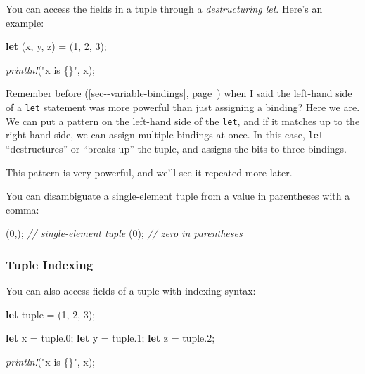\documentclass[a4paper,]{book}
\renewcommand*{\hyperref}[2][\ar]{%
  \def\ar{#2}%
  #2 (\autoref{#1}, page~\pageref{#1})}
\newenvironment{Shaded}{\begin{snugshade}}{\end{snugshade}}
\newcommand{\KeywordTok}[1]{\textcolor[rgb]{0.13,0.29,0.53}{\textbf{{#1}}}}
\newcommand{\DecValTok}[1]{\textcolor[rgb]{0.00,0.00,0.81}{{#1}}}
\newcommand{\StringTok}[1]{\textcolor[rgb]{0.31,0.60,0.02}{{#1}}}
\newcommand{\CommentTok}[1]{\textcolor[rgb]{0.56,0.35,0.01}{\textit{{#1}}}}
\newcommand{\PreprocessorTok}[1]{\textcolor[rgb]{0.56,0.35,0.01}{\textit{{#1}}}}
\newcommand{\NormalTok}[1]{{#1}}
\begin{document}
You can access the fields in a tuple through a \emph{destructuring let}.
Here's an example:

\begin{Shaded}
\begin{Highlighting}[]
\KeywordTok{let} \NormalTok{(x, y, z) = (}\DecValTok{1}\NormalTok{, }\DecValTok{2}\NormalTok{, }\DecValTok{3}\NormalTok{);}

\PreprocessorTok{println!}\NormalTok{(}\StringTok{"x is \{\}"}\NormalTok{, x);}
\end{Highlighting}
\end{Shaded}

Remember \hyperref[sec--variable-bindings]{before} when I said the
left-hand side of a \texttt{let} statement was more powerful than just
assigning a binding? Here we are. We can put a pattern on the left-hand
side of the \texttt{let}, and if it matches up to the right-hand side,
we can assign multiple bindings at once. In this case, \texttt{let}
``destructures'' or ``breaks up'' the tuple, and assigns the bits to
three bindings.

This pattern is very powerful, and we'll see it repeated more later.

You can disambiguate a single-element tuple from a value in parentheses
with a comma:

\begin{Shaded}
\begin{Highlighting}[]
\NormalTok{(}\DecValTok{0}\NormalTok{,); }\CommentTok{// single-element tuple}
\NormalTok{(}\DecValTok{0}\NormalTok{); }\CommentTok{// zero in parentheses}
\end{Highlighting}
\end{Shaded}

\subsubsection{Tuple Indexing}\label{tuple-indexing}

You can also access fields of a tuple with indexing syntax:

\begin{Shaded}
\begin{Highlighting}[]
\KeywordTok{let} \NormalTok{tuple = (}\DecValTok{1}\NormalTok{, }\DecValTok{2}\NormalTok{, }\DecValTok{3}\NormalTok{);}

\KeywordTok{let} \NormalTok{x = tuple.}\DecValTok{0}\NormalTok{;}
\KeywordTok{let} \NormalTok{y = tuple.}\DecValTok{1}\NormalTok{;}
\KeywordTok{let} \NormalTok{z = tuple.}\DecValTok{2}\NormalTok{;}

\PreprocessorTok{println!}\NormalTok{(}\StringTok{"x is \{\}"}\NormalTok{, x);}
\end{Highlighting}
\end{Shaded}
\end{document}
